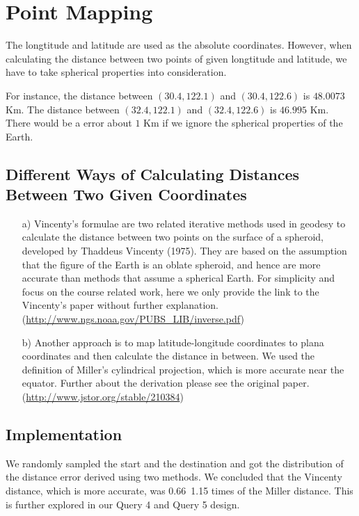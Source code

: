 \documentclass[final,1p,times]{elsarticle}
\begin{document}
\section{Point Mapping}
The longtitude and latitude are used as the absolute coordinates. However, when calculating the distance between two points of given longtitude and latitude, we have to take spherical properties into consideration.

For instance, the distance between $(30.4, 122.1)$ and $(30.4, 122.6)$ is $48.0073$ Km. The distance between $(32.4, 122.1)$ and $(32.4, 122.6)$ is $46.995$ Km. There would be a error about $1$ Km if we ignore the spherical properties of the Earth.

\subsection{Different Ways of Calculating Distances Between Two Given Coordinates}
\begin{enumerate}
\item[a)] Vincenty's formulae are two related iterative methods used in geodesy to calculate the distance between two points on the surface of a spheroid, developed by Thaddeus Vincenty (1975). They are based on the assumption that the figure of the Earth is an oblate spheroid, and hence are more accurate than methods that assume a spherical Earth.
For simplicity and focus on the course related work, here we only provide the link to the Vincenty’s paper without further explanation. 
(\url{http://www.ngs.noaa.gov/PUBS_LIB/inverse.pdf})

\item[b)] Another approach is to map latitude-longitude coordinates to plana coordinates and then calculate the distance in between. We used the definition of Miller’s cylindrical projection, which is more accurate near the equator. Further about the derivation please see the original paper. (\url{http://www.jstor.org/stable/210384})
\end{enumerate}

\subsection{Implementation}
We randomly sampled the start and the destination and got the distribution of the distance error derived using two methods. We concluded that the Vincenty distance, which is more accurate, was 0.66~1.15 times of the Miller distance. This is further explored in our Query 4 and Query 5 design.
\end{document}
